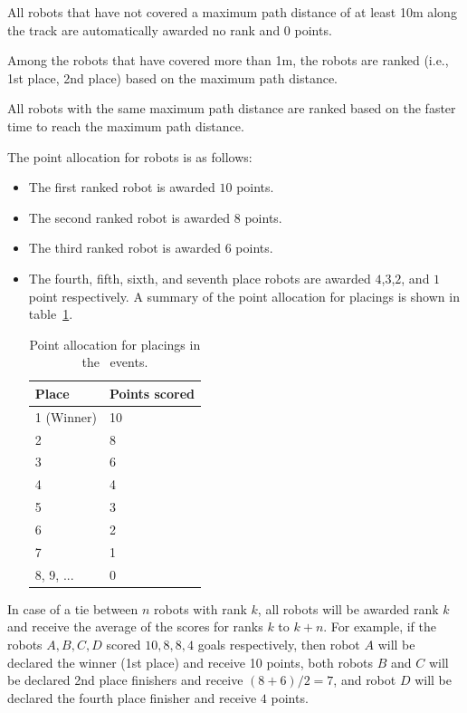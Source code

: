 \documentclass[12pt]{hurocup}
\begin{document}

\begin{lawlist}[MR]
\item All robots that have not covered a maximum path distance of at least
  10m along the track are automatically awarded no rank and $0$
  points.
\item Among the robots that have covered more than 1m, the robots are
  ranked (i.e., 1st place, 2nd place) based on the maximum path distance.
\item All robots with the same maximum path distance are ranked based
  on the faster time to reach the maximum path distance.

\item The point allocation for robots is as follows:
  \begin{itemize}
  \item The first ranked robot is awarded $10$ points.
  \item The second ranked robot is awarded $8$ points.
  \item The third ranked robot is awarded $6$ points.
  \item The fourth, fifth, sixth, and seventh place robots are awarded
    $4$,$3$,$2$, and $1$ point respectively.  A summary of the point
    allocation for placings is shown in table~\ref{point-allocation}.

    \begin{table}
      \begin{center}
        \begin{tabular}{l|l}
          \hline
          Place & Points scored \\
          \hline
          1 (Winner) & 10 \\
          2          & 8 \\
          3          & 6 \\
          4          & 4 \\
          5          & 3 \\
          6          & 2 \\
          7          & 1 \\
          8, 9, ...  & 0 \\
          \hline
        \end{tabular}
      \end{center}
      \caption{Point allocation for placings in the \HuroCup\ events.}
      \label{point-allocation}
    \end{table}
  \end{itemize}

\item In case of a tie between $n$ robots with rank $k$, all robots
 will be awarded rank $k$ and receive the average of the scores for
 ranks $k$ to $k+n$.  For example, if the robots $A,B,C,D$ scored $10,
 8, 8, 4$ goals respectively, then robot $A$ will be declared the
 winner (1st place) and receive 10 points, both robots $B$ and $C$
 will be declared 2nd place finishers and receive $(8+6)/2=7$, and
 robot $D$ will be declared the fourth place finisher and receive $4$
 points.

\end{lawlist}
\end{document}
